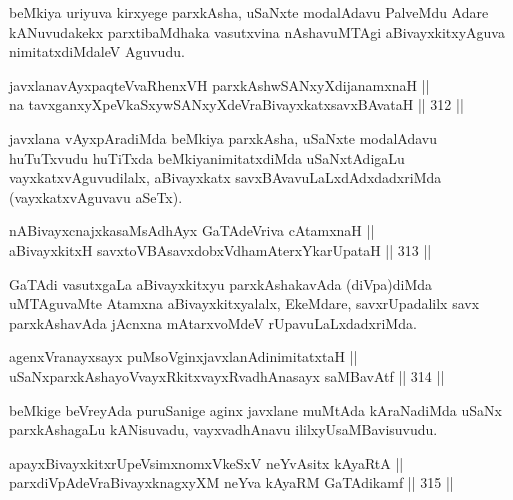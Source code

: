 \begin{artha}
beMkiya uriyuva kirxyege parxkAsha, uSaNxte modalAdavu PalveMdu Adare
kANuvudakekx parxtibaMdhaka vasutxvina nAshavuMTAgi aBivayxkitxyAguva
nimitatxdiMdaleV Aguvudu.
\end{artha}

\begin{shl}
javxlanavAyxpaqteVvaRhenxVH parxkAshwSANxyXdijanamxnaH || \\
na tavxganxyXpeVkaSxywSANxyXdeVraBivayxkatxsavxBAvataH \hfill || 312 ||  
\end{shl}

\begin{artha}
javxlana vAyxpAradiMda beMkiya parxkAsha, uSaNxte modalAdavu
huTuTxvudu huTiTxda beMkiyanimitatxdiMda uSaNxtAdigaLu
vayxkatxvAguvudilalx, aBivayxkatx savxBAvavuLaLxdAdxdadxriMda
(vayxkatxvAguvavu aSeTx).
\end{artha}

\begin{shl}
nABivayxcnajxkasaMsAdhAyx GaTAdeVriva cA\s \s tamxnaH || \\
aBivayxkitxH savxtoVBAsavxdobxVdhamAterxYkarUpataH \hfill || 313 ||  
\end{shl}

\begin{artha}
GaTAdi vasutxgaLa aBivayxkitxyu parxkAshakavAda (diVpa)diMda\break
uMTAguvaMte Atamxna aBivayxkitxyalalx, EkeMdare, savxrUpadalilx savx
parxkAshavAda jAcnxna mAtarxvoMdeV rUpavuLaLxdadxriMda.
\end{artha}


\begin{shl}
agenxVranayxsayx puMsoV\s ginxjavxlanAdinimitatxtaH ||  \\
uSaNxparxkAshayoVvayxRkitxvayxRvadhAnasayx saMBavAtf \hfill || 314 ||  
\end{shl}

\begin{artha}
beMkige beVreyAda puruSanige aginx javxlane muMtAda kAraNadiMda uSaNx
parxkAshagaLu kANisuvadu, vayxvadhAnavu ililxyU\break saMBavisuvudu.
\end{artha}

\begin{shl}
apayxBivayxkitxrUpeV\s simxnomxVkeSxV neYvAsitx kAyaRtA || \\
parxdiVpAdeVraBivayxknagxyXM neYva kAyaRM GaTAdikamf \hfill || 315 ||  
\end{shl}

